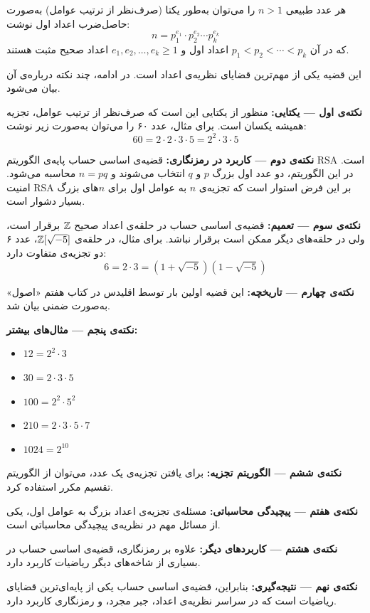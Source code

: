 \documentclass{matinbook}
\begin{document}
\begin{theorem}
    هر عدد طبیعی $n > 1$ را می‌توان به‌طور یکتا (صرف‌نظر از
    ترتیب عوامل) به‌صورت حاصل‌ضرب اعداد اول نوشت:
    \[
    n = p_1^{e_1} \cdot p_2^{e_2} \cdots p_k^{e_k}
    \]
    که در آن $p_1 < p_2 < \cdots < p_k$ اعداد اول و
    $e_1, e_2, \ldots, e_k \geq 1$ اعداد صحیح مثبت هستند.

    این قضیه یکی از مهم‌ترین قضایای نظریه‌ی اعداد است.
    در ادامه، چند نکته درباره‌ی آن بیان می‌شود.

    \textbf{نکته‌ی اول — یکتایی:} منظور از یکتایی این است
    که صرف‌نظر از ترتیب عوامل، تجزیه همیشه یکسان است.
    برای مثال، عدد ۶۰ را می‌توان به‌صورت زیر نوشت:
    \[
    60 = 2 \cdot 2 \cdot 3 \cdot 5 = 2^2 \cdot 3 \cdot 5
    \]

    \textbf{نکته‌ی دوم — کاربرد در رمزنگاری:} قضیه‌ی اساسی
    حساب پایه‌ی الگوریتم RSA است. در این الگوریتم، دو عدد
    اول بزرگ $p$ و $q$ انتخاب می‌شوند و $n = pq$ محاسبه
    می‌شود. امنیت RSA بر این فرض استوار است که تجزیه‌ی
    $n$ به عوامل اول برای $n$های بزرگ بسیار دشوار است.

    \textbf{نکته‌ی سوم — تعمیم:} قضیه‌ی اساسی حساب در
    حلقه‌ی اعداد صحیح $\mathbb{Z}$ برقرار است، ولی در حلقه‌های
    دیگر ممکن است برقرار نباشد. برای مثال، در حلقه‌ی
    $\mathbb{Z}[\sqrt{-5}]$، عدد ۶ دو تجزیه‌ی متفاوت دارد:
    \[
    6 = 2 \cdot 3 = (1 + \sqrt{-5})(1 - \sqrt{-5})
    \]

    \textbf{نکته‌ی چهارم — تاریخچه:} این قضیه اولین بار
    توسط اقلیدس در کتاب هفتم «اصول» به‌صورت ضمنی بیان شد.

    \textbf{نکته‌ی پنجم — مثال‌های بیشتر:}
    \begin{itemize}
        \item $12 = 2^2 \cdot 3$
        \item $30 = 2 \cdot 3 \cdot 5$
        \item $100 = 2^2 \cdot 5^2$
        \item $210 = 2 \cdot 3 \cdot 5 \cdot 7$
        \item $1024 = 2^{10}$
    \end{itemize}

    \textbf{نکته‌ی ششم — الگوریتم تجزیه:} برای یافتن
    تجزیه‌ی یک عدد، می‌توان از الگوریتم تقسیم مکرر
    استفاده کرد.

    \textbf{نکته‌ی هفتم — پیچیدگی محاسباتی:} مسئله‌ی
    تجزیه‌ی اعداد بزرگ به عوامل اول، یکی از مسائل مهم
    در نظریه‌ی پیچیدگی محاسباتی است.

    \textbf{نکته‌ی هشتم — کاربردهای دیگر:} علاوه بر
    رمزنگاری، قضیه‌ی اساسی حساب در بسیاری از شاخه‌های
    دیگر ریاضیات کاربرد دارد.

    \textbf{نکته‌ی نهم — نتیجه‌گیری:} بنابراین، قضیه‌ی
    اساسی حساب یکی از پایه‌ای‌ترین قضایای ریاضیات است
    که در سراسر نظریه‌ی اعداد، جبر مجرد، و رمزنگاری
    کاربرد دارد.

    \label{thm:fundamental-arithmetic}
\end{theorem}
\end{document}
